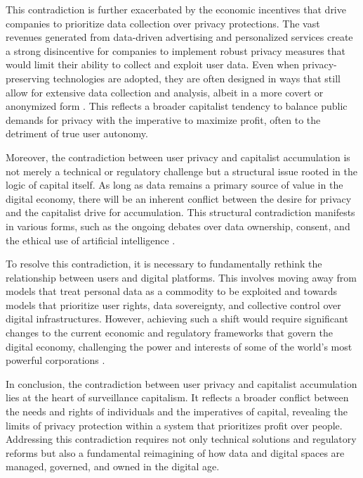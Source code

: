 \begin{refsection}
This contradiction is further exacerbated by the economic incentives that drive companies to prioritize data collection over privacy protections. The vast revenues generated from data-driven advertising and personalized services create a strong disincentive for companies to implement robust privacy measures that would limit their ability to collect and exploit user data. Even when privacy-preserving technologies are adopted, they are often designed in ways that still allow for extensive data collection and analysis, albeit in a more covert or anonymized form \cite[pp.~82-85]{schneier2015data}. This reflects a broader capitalist tendency to balance public demands for privacy with the imperative to maximize profit, often to the detriment of true user autonomy.

Moreover, the contradiction between user privacy and capitalist accumulation is not merely a technical or regulatory challenge but a structural issue rooted in the logic of capital itself. As long as data remains a primary source of value in the digital economy, there will be an inherent conflict between the desire for privacy and the capitalist drive for accumulation. This structural contradiction manifests in various forms, such as the ongoing debates over data ownership, consent, and the ethical use of artificial intelligence \cite[pp.~101-104]{zeynep2014engineering}.

To resolve this contradiction, it is necessary to fundamentally rethink the relationship between users and digital platforms. This involves moving away from models that treat personal data as a commodity to be exploited and towards models that prioritize user rights, data sovereignty, and collective control over digital infrastructures. However, achieving such a shift would require significant changes to the current economic and regulatory frameworks that govern the digital economy, challenging the power and interests of some of the world’s most powerful corporations \cite[pp.~213-216]{morozov2013to}.

In conclusion, the contradiction between user privacy and capitalist accumulation lies at the heart of surveillance capitalism. It reflects a broader conflict between the needs and rights of individuals and the imperatives of capital, revealing the limits of privacy protection within a system that prioritizes profit over people. Addressing this contradiction requires not only technical solutions and regulatory reforms but also a fundamental reimagining of how data and digital spaces are managed, governed, and owned in the digital age.


\end{refsection}
